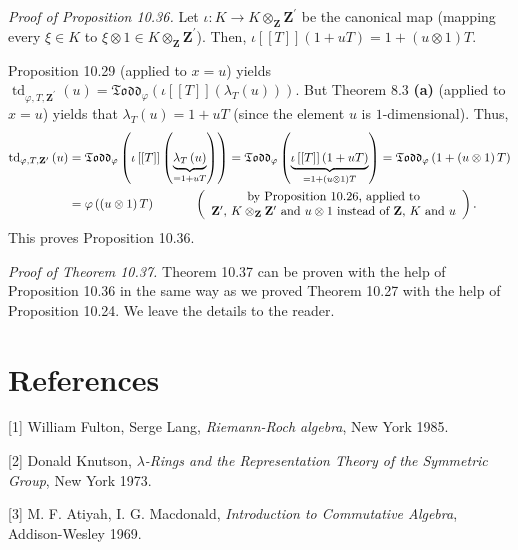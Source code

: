 \documentclass[numbers=enddot,12pt,final,onecolumn,notitlepage]{scrartcl}%
\begin{document}
\textit{Proof of Proposition 10.36.} Let $\iota:K\rightarrow K\otimes
_{\mathbf{Z}}\mathbf{Z}^{\prime}$ be the canonical map (mapping every $\xi\in
K$ to $\xi\otimes1\in K\otimes_{\mathbf{Z}}\mathbf{Z}^{\prime}$). Then,
$\iota\left[  \left[  T\right]  \right]  \left(  1+uT\right)  =1+\left(
u\otimes1\right)  T$.

Proposition 10.29 (applied to $x=u$) yields $\operatorname*{td}_{\varphi
,T,\mathbf{Z}^{\prime}}\left(  u\right)  =\mathfrak{Todd}_{\varphi}\left(
\iota\left[  \left[  T\right]  \right]  \left(  \lambda_{T}\left(  u\right)
\right)  \right)  $. But Theorem 8.3 \textbf{(a)} (applied to $x=u$) yields
that $\lambda_{T}\left(  u\right)  =1+uT$ (since the element $u$ is
$1$-dimensional). Thus,%
\begin{align*}
\operatorname*{td}\nolimits_{\varphi,T,\mathbf{Z}^{\prime}}\left(  u\right)
&  =\mathfrak{Todd}_{\varphi}\left(  \iota\left[  \left[  T\right]  \right]
\left(  \underbrace{\lambda_{T}\left(  u\right)  }_{=1+uT}\right)  \right)
=\mathfrak{Todd}_{\varphi}\left(  \underbrace{\iota\left[  \left[  T\right]
\right]  \left(  1+uT\right)  }_{=1+\left(  u\otimes1\right)  T}\right)
=\mathfrak{Todd}_{\varphi}\left(  1+\left(  u\otimes1\right)  T\right) \\
&  =\varphi\left(  \left(  u\otimes1\right)  T\right)
\ \ \ \ \ \ \ \ \ \ \left(
\begin{array}
[c]{c}%
\text{by Proposition 10.26, applied to}\\
\mathbf{Z}^{\prime}\text{, }K\otimes_{\mathbf{Z}}\mathbf{Z}^{\prime}\text{ and
}u\otimes1\text{ instead of }\mathbf{Z}\text{, }K\text{ and }u
\end{array}
\right)  .
\end{align*}
This proves Proposition 10.36.

\textit{Proof of Theorem 10.37.} Theorem 10.37 can be proven with the help of
Proposition 10.36 in the same way as we proved Theorem 10.27 with the help of
Proposition 10.24. We leave the details to the reader.

\section*{References}

[1] William Fulton, Serge Lang, \textit{Riemann-Roch algebra}, New York 1985.

[2] Donald Knutson, $\lambda$\textit{-Rings and the Representation Theory of
the Symmetric Group}, New York 1973.

[3] M. F. Atiyah, I. G. Macdonald, \textit{Introduction to Commutative
Algebra}, Addison-Wesley 1969.
\end{document}
